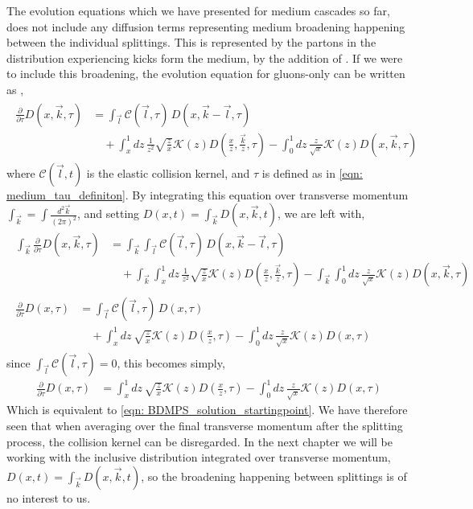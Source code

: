 \documentclass[main.tex]{subfiles}
\begin{document}
The evolution equations which we have presented for medium cascades so far, does not include any diffusion terms representing medium broadening happening between the individual splittings. This is represented by the partons in the distribution experiencing kicks form the medium, by the addition of . If we were to include this broadening, the evolution equation for gluons-only can be written as \cite{Probabilistic_picture, system_of_evolutionequations},
\begin{align}\label{eqn: BDMPSZ_3.19_ProbPic}
    \begin{split}
    \frac{\partial}{\partial \tau} D(x,\vec k, \tau) &= \int_{\vec l}\mathcal{C}(\vec l,\tau) \, D(x, \vec k - \vec l, \tau) \\
    &\quad + \int_x^1 dz\, \frac{1
    }{z^2} \sqrt{\frac{z}{x}} \mathcal{K}(z) D(\frac{x}{z}, \frac{\vec k}{z}, \tau) - \int_0^1 dz\, \frac{z}{\sqrt{x}} \mathcal{K}(z) D(x,\vec k, \tau)
    \end{split}
\end{align}
where \(\mathcal{C}(\vec l,t)\) is the elastic collision kernel, and \(\tau\) is defined as in \autoref{eqn: medium_tau_definiton}. By integrating this equation over transverse momentum \(\int_{\vec k} = \int \frac{d^2 \vec k}{(2\pi)^2}\), and setting \(D(x,t) = \int_{\vec k} D(x, \vec k, t)\), we are left with,
\begin{align}
    \begin{split}
    \int_{\vec k} \frac{\partial}{\partial \tau} D(x,\vec k, \tau) &= \int_{\vec k} \int_{\vec l}\mathcal{C}(\vec l,\tau) \, D(x, \vec k - \vec l, \tau) \\
    &\quad +  \int_{\vec k} \int_x^1 dz\, \frac{1}{z^2} \sqrt{\frac{z}{x}} \mathcal{K}(z) D(\frac{x}{z}, \frac{\vec k}{z}, \tau) - \int_{\vec k} \int_0^1 dz\,\frac{z}{\sqrt{x}} \mathcal{K}(z) D(x,\vec k, \tau)
    \end{split}\\
    \begin{split}
    \frac{\partial}{\partial \tau} D(x, \tau) &= \int_{\vec l}\mathcal{C}(\vec l,\tau) \, D(x, \tau) \\
    &\quad + \int_x^1 dz\, \sqrt{\frac{z}{x}} \mathcal{K}(z) D(\frac{x}{z}, \tau) - \int_0^1 dz\, \frac{z}{\sqrt{x}} \mathcal{K}(z) D(x, \tau)
    \end{split}
\end{align}
since \(\int_{\vec l} \mathcal{C}(\vec l, \tau) = 0\), this becomes simply, 
\begin{align}
     \frac{\partial}{\partial \tau} D(x, \tau) &= \int_x^1 dz\, \sqrt{\frac{z}{x}} \mathcal{K}(z) D(\frac{x}{z}, \tau) - \int_0^1 dz\, \frac{z}{\sqrt{x}} \mathcal{K}(z) D(x, \tau)
\end{align}
Which is equivalent to \autoref{eqn: BDMPS_solution_startingpoint}. We have therefore seen that when averaging over the final transverse momentum after the splitting process, the collision kernel can be disregarded. In the next chapter we will be working with the inclusive distribution integrated over transverse momentum, \(D(x,t) = \int_{\vec k} D(x, \vec k, t)\), so the broadening happening between splittings is of no interest to us.
\end{document}
